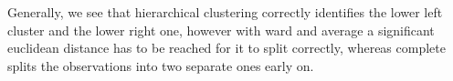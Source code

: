 \noindent Generally, we see that hierarchical clustering correctly identifies the lower left cluster and the lower right one, however with ward and average a significant euclidean distance has to be reached for it to split correctly, whereas complete splits the observations into two separate ones early on. 









